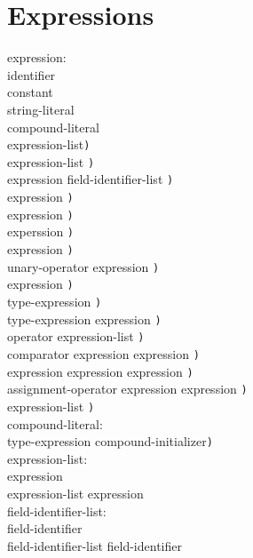 \documentclass[a4j,twocolumn]{article}
\begin{document}
\section{Expressions}
\it

\noindent
expression: \\
\quad identifier \\
\quad constant \\
\quad string-literal \\
\quad compound-literal \\
\quad {\tt (}expression-list{\tt )} \\
 expression-list {\tt )} \\
 expression field-identifier-list {\tt )} \\
 expression {\tt )} \\
 expression {\tt )} \\
\quad {\tt (++} experssion {\tt )} \\
\quad {\tt (--} expression {\tt )} \\
\quad {\tt (}unary-operator expression {\tt )} \\
 expression {\tt )} \\
 type-expression {\tt )} \\
 type-expression expression {\tt )} \\
\quad {\tt (}operator expression-list {\tt )} \\
\quad {\tt (}comparator expression expression {\tt )} \\
 expression expression expression {\tt )} \\
\quad {\tt (}assignment-operator expression expression {\tt )} \\
 expression-list {\tt )} \\

\noindent
compound-literal: \\
 type-expression compound-initializer{\tt )} \\

\noindent
expression-list: \\
\quad expression \\
\quad expression-list expression \\

\noindent
field-identifier-list: \\
\quad field-identifier \\
\quad field-identifier-list field-identifier \\
\end{document}
